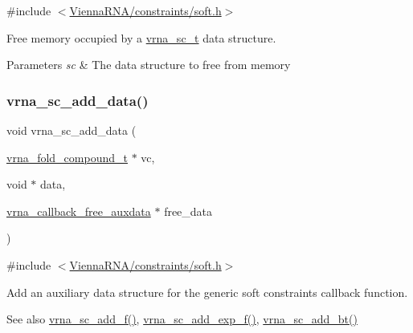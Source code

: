 {\ttfamily \#include $<$\mbox{\hyperlink{soft_8h}{Vienna\+R\+N\+A/constraints/soft.\+h}}$>$}



Free memory occupied by a \mbox{\hyperlink{group__soft__constraints_ga75401ce219ef8dbcceb672db82d434c6}{vrna\+\_\+sc\+\_\+t}} data structure. 


\begin{DoxyParams}{Parameters}
{\em sc} & The data structure to free from memory \\
\hline
\end{DoxyParams}
\mbox{\label{group__soft__constraints_ga15c6d52471ec97897e2bb7f964f5deb6}} 
\subsubsection{\texorpdfstring{vrna\_sc\_add\_data()}{vrna\_sc\_add\_data()}}
{\footnotesize\ttfamily void vrna\+\_\+sc\+\_\+add\+\_\+data (\begin{DoxyParamCaption}\item[{\mbox{\hyperlink{group__fold__compound_ga1b0cef17fd40466cef5968eaeeff6166}{vrna\+\_\+fold\+\_\+compound\+\_\+t}} $\ast$}]{vc,  }\item[{void $\ast$}]{data,  }\item[{\mbox{\hyperlink{group__fold__compound_ga7806651f51b195013839a218b3bbd5a3}{vrna\+\_\+callback\+\_\+free\+\_\+auxdata}} $\ast$}]{free\+\_\+data }\end{DoxyParamCaption})}



{\ttfamily \#include $<$\mbox{\hyperlink{soft_8h}{Vienna\+R\+N\+A/constraints/soft.\+h}}$>$}



Add an auxiliary data structure for the generic soft constraints callback function. 

\begin{DoxySeeAlso}{See also}
\mbox{\hyperlink{group__soft__constraints_ga8c7d907ec0125cd61c04e0908010a4e9}{vrna\+\_\+sc\+\_\+add\+\_\+f()}}, \mbox{\hyperlink{group__soft__constraints_ga87e382b5d0c9b7d9ce1b79c0473ff700}{vrna\+\_\+sc\+\_\+add\+\_\+exp\+\_\+f()}}, \mbox{\hyperlink{group__soft__constraints_gabde7d07a79bb9a8f4721aee247b674ea}{vrna\+\_\+sc\+\_\+add\+\_\+bt()}}
\end{DoxySeeAlso}

